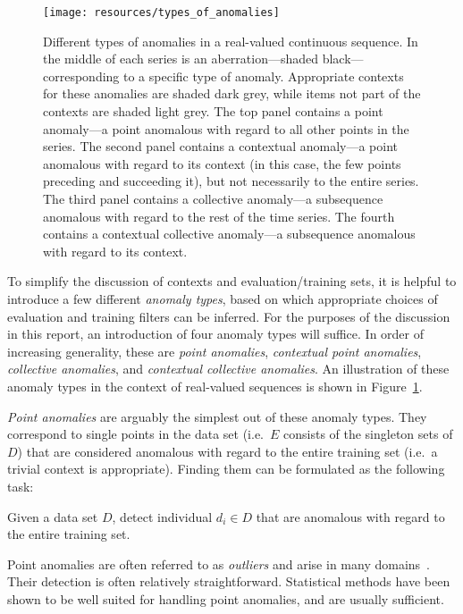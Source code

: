 \begin{figure}[htb]
    \begin{center}
        \texttt{[image: resources/types\_of\_anomalies]}
    \end{center}
    \caption{{\small Different types of anomalies in a real-valued continuous sequence. In the middle of each series is an aberration---shaded black---corresponding to a specific type of anomaly. Appropriate contexts for these anomalies are shaded dark grey, while items not part of the contexts are shaded light grey. The top panel contains a point anomaly---a point anomalous with regard to all other points in the series. The second panel contains a contextual anomaly---a point anomalous with regard to its context (in this case, the few points preceding and succeeding it), but not necessarily to the entire series. The third panel contains a collective anomaly---a subsequence anomalous with regard to the rest of the time series. The fourth contains a contextual collective anomaly---a subsequence anomalous with regard to its context.}}
\label{fig:anomaly_types}
\end{figure}

To simplify the discussion of contexts and evaluation/training sets, it is helpful to introduce a few different \emph{anomaly types}, based on which appropriate choices of evaluation and training filters can be inferred. For the purposes of the discussion in this report, an introduction of four anomaly types will suffice. In order of increasing generality, these are \emph{point anomalies}, \emph{contextual point anomalies}, \emph{collective anomalies}, and \emph{contextual collective anomalies}. An illustration of these anomaly types in the context of real-valued sequences is shown in Figure~\ref{fig:anomaly_types}.

\emph{Point anomalies} are arguably the simplest out of these anomaly types. They correspond to single points in the data set (i.e.\ $E$ consists of the singleton sets of $D$) that are considered anomalous with regard to the entire training set (i.e.\ a trivial context is appropriate). Finding them can be formulated as the following task:

\begin{task}
\label{task:point}
  Given a data set $D$, detect individual $d_i \in D$ that are anomalous with regard to the entire training set.
\end{task}

Point anomalies are often referred to as \emph{outliers} and arise in many domains~\cite{eskin}. Their detection is often relatively straightforward. Statistical methods have been shown to be well suited for handling point anomalies, and are usually sufficient.

